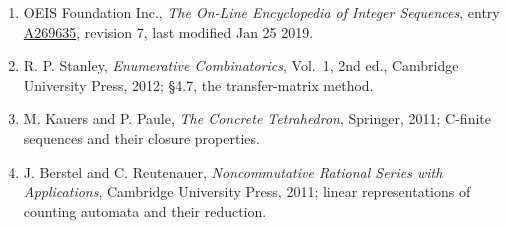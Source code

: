 \documentclass[11pt]{article}
\theoremstyle{definition}
\begin{document}
\begin{enumerate}

\item OEIS Foundation Inc., \emph{The On-Line Encyclopedia of Integer Sequences}, entry \href{https://oeis.org/A269635}{A269635}, revision 7, last modified Jan 25 2019.

\item R. P. Stanley, \emph{Enumerative Combinatorics}, Vol.~1, 2nd ed., Cambridge University Press, 2012; \S4.7, the transfer-matrix method.

\item M. Kauers and P. Paule, \emph{The Concrete Tetrahedron}, Springer, 2011; C-finite sequences and their closure properties.

\item J. Berstel and C. Reutenauer, \emph{Noncommutative Rational Series with Applications}, Cambridge University Press, 2011; linear representations of counting automata and their reduction.

\end{enumerate}
\end{document}

